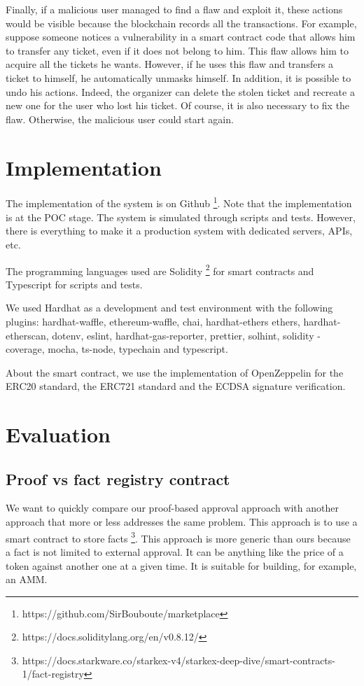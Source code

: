 \documentclass[a4paper,11pt,oneside]{report}
\begin{document}
Finally, if a malicious user managed to find a flaw and exploit it, these actions would be visible because the blockchain records all the transactions. For example, suppose someone notices a vulnerability in a smart contract code that allows him to transfer any ticket, even if it does not belong to him. This flaw allows him to acquire all the tickets he wants. However, if he uses this flaw and transfers a ticket to himself, he automatically unmasks himself. In addition, it is possible to undo his actions. Indeed, the organizer can delete the stolen ticket and recreate a new one for the user who lost his ticket. Of course, it is also necessary to fix the flaw. Otherwise, the malicious user could start again.

\chapter{Implementation}
The implementation of the system is on Github \footnote{https://github.com/SirBouboute/marketplace}. Note that the implementation is at the POC stage. The system is simulated through scripts and tests. However, there is everything to make it a production system with dedicated servers, APIs, etc.

The programming languages used are Solidity \footnote{https://docs.soliditylang.org/en/v0.8.12/} for smart contracts and Typescript for scripts and tests. 

We used Hardhat as a development and test environment with the following plugins: hardhat-waffle, ethereum-waffle, chai, hardhat-ethers ethers, hardhat-etherscan, dotenv, eslint, hardhat-gas-reporter, prettier, solhint, solidity -coverage, mocha, ts-node, typechain and typescript. 

About the smart contract, we use the implementation of OpenZeppelin for the ERC20 standard, the ERC721 standard and the ECDSA signature verification.

\chapter{Evaluation}
\section{Proof vs fact registry contract}
We want to quickly compare our proof-based approval approach with another approach that more or less addresses the same problem. This approach is to use a smart contract to store facts \footnote{https://docs.starkware.co/starkex-v4/starkex-deep-dive/smart-contracts-1/fact-registry}. This approach is more generic than ours because a fact is not limited to external approval. It can be anything like the price of a token against another one at a given time. It is suitable for building, for example, an AMM. 
\end{document}
